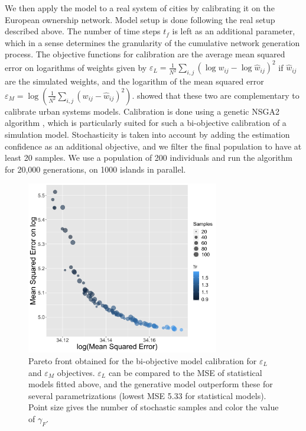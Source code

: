 \documentclass[10pt,letterpaper]{article}
\begin{document}
We then apply the model to a real system of cities by calibrating it on the European ownership network. Model setup is done following the real setup described above. The number of time steps $t_f$ is left as an additional parameter, which in a sense determines the granularity of the cumulative network generation process. The objective functions for calibration are the average mean squared error on logarithms of weights given by $\varepsilon_L = \frac{1}{N^2} \sum_{i,j} \left(\log w_{ij} - \log \hat{w}_{ij} \right)^2$ if $\hat{w}_{ij}$ are the simulated weights, and the logarithm of the mean squared error $\varepsilon_M = \log\left(\frac{1}{N^2} \sum_{i,j} \left(w_{ij} - \hat{w}_{ij}\right)^2 \right)$. \cite{raimbault2018indirect} showed that these two are complementary to calibrate urban systems models. Calibration is done using a genetic NSGA2 algorithm \cite{deb2002fast}, which is particularly suited for such a bi-objective calibration of a simulation model. Stochasticity is taken into account by adding the estimation confidence as an additional objective, and we filter the final population to have at least 20 samples. We use a population of 200 individuals and run the algorithm for 20,000 generations, on 1000 islands in parallel.


\begin{figure}
	\begin{center}
    \includegraphics[width=0.75\textwidth]{figures/pareto_colorgammaOrigin.png}
    \end{center}
	\caption{Pareto front obtained for the bi-objective model calibration for $\varepsilon_L$ and $\varepsilon_M$ objectives. $\varepsilon_L$ can be compared to the MSE of statistical models fitted above, and the generative model outperform these for several parametrizations (lowest MSE 5.33 for statistical models). Point size gives the number of stochastic samples and color the value of $\gamma_F$.\label{fig:calibration}}
\end{figure}
\end{document}
